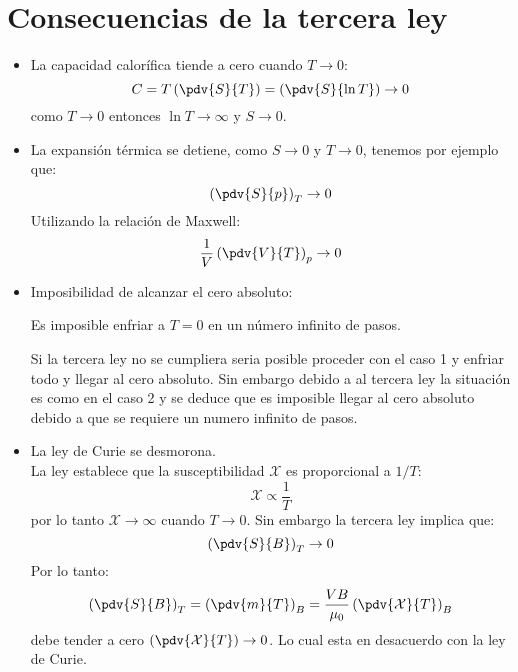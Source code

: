 \documentclass[../main]{subfiles}
\begin{document}
\section{Consecuencias de la tercera ley}
\begin{itemize}
    \item La capacidad calorífica tiende a cero cuando $T\rightarrow 0$:
          \begin{equation}
              C=T \left( \pdv{S}{T}\right)=\left(\pdv{S}{\ln{T}}\right)\rightarrow 0
          \end{equation}
          como $T \rightarrow 0$ entonces $\ln{T}\rightarrow \infty$ y $S \rightarrow 0$.
    \item La expansión térmica se detiene, como $S \rightarrow 0$ y $T \rightarrow 0$, tenemos por ejemplo que:
          \begin{equation}
              \left( \pdv{S}{p}\right)_T \rightarrow 0
          \end{equation}
          Utilizando la relación de Maxwell:
          \begin{equation}
              \dfrac{1}{V}\left( \pdv{V}{T}\right)_p \rightarrow 0
          \end{equation}
    \item Imposibilidad de alcanzar el cero absoluto:
          \begin{center}
              Es imposible enfriar a $T=0$ en un número infinito de pasos.
          \end{center}
          Si la tercera ley no se cumpliera seria posible proceder con el caso 1 y enfriar todo y llegar al cero absoluto. Sin embargo debido a al tercera ley la situación es como en el caso 2 y se deduce que es imposible llegar al cero absoluto debido a que se requiere un numero infinito de pasos.
    \item La ley de Curie se desmorona. \\[0.3cm]
          La ley establece que la susceptibilidad $\mathcal{X}$ es proporcional a $1/T$:
          \begin{equation}
              \mathcal{X}\propto \dfrac{1}{T}
          \end{equation}
          por lo tanto $\mathcal{X} \rightarrow \infty$ cuando $T\rightarrow 0$. Sin embargo la tercera ley implica que:
          \begin{equation}
              \left( \pdv{S}{B}\right)_T \rightarrow 0
          \end{equation}
          Por lo tanto:
          \begin{equation}
              \left( \pdv{S}{B}\right)_T=\left( \pdv{m}{T}\right)_B=\dfrac{VB}{\mu_0} \left( \pdv{\mathcal{X}}{T}\right)_B
          \end{equation}
          debe tender a cero $\displaystyle \left( \pdv{\mathcal{X}}{T}\right)\rightarrow 0$. Lo cual esta en desacuerdo con la ley de Curie.
\end{itemize}
\end{document}

